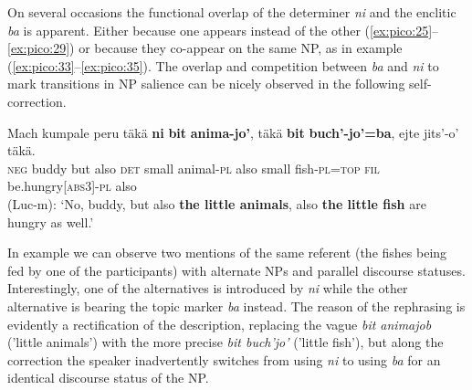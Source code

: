 \documentclass[output=paper
,modfonts
,nonflat]{langsci/langscibook}
\begin{document}
\z


On several occasions the functional overlap of the determiner \textit{ni} and the enclitic \textit{ba} is apparent. Either because one appears instead of the other (\ref{ex:pico:25}--\ref{ex:pico:29}) or because they co-appear on the same NP, as in example (\ref{ex:pico:33}--\ref{ex:pico:35}). The overlap and competition between \textit{ba} and \textit{ni} to mark transitions in NP salience can be nicely observed in the following self-correction.


\ea
\label{ex:pico:36}

\gll Mach kumpale peru t\"ak\"a \textbf{ni} \textbf{bit} \textbf{anima-jo'}, t\"ak\"a \textbf{bit} \textbf{buch'-jo'=ba}, ejte jits'-o' t\"ak\"a.\\
{\textsc{neg}} buddy but also {\textsc{det}} small animal-{\textsc{pl}} also small fish-{\textsc{pl}}={\textsc{top}} {\textsc{fil}} be.hungry{\textsc{[abs3]}}-{\textsc{pl}} also\\
\glt (Luc-m): `No, buddy, but also \textbf{the little animals}, also \textbf{the little fish} are hungry as well.'
\z

In example  we can observe two mentions of the same referent (the fishes being fed by one of the participants) with alternate NPs and parallel discourse statuses. Interestingly, one of the alternatives is introduced by \textit{ni} while the other alternative is bearing the topic marker \textit{ba} instead. The reason of the rephrasing is evidently a rectification of the description, replacing the vague \textit{bit animajob} ('little animals') with the more precise \textit{bit buch'jo'} ('little fish'), but along the correction the speaker inadvertently switches from using \textit{ni} to using \textit{ba} for an identical discourse status of the NP.
\end{document}
